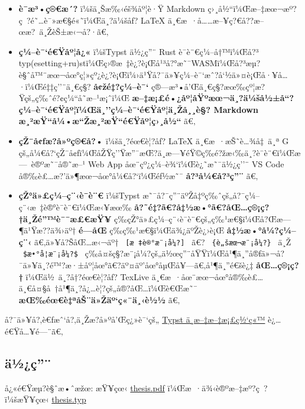 \begin{itemize}
\tightlist
\item
  \textbf{è¯­æ³•ç®€æ´?} ï¼šä¸Šæ‰‹éš¾åº¦è·Ÿ Markdown
  ç›¸å½``ï¼Œæ--‡æœ¬æº?ç~?é˜\ldots è¯»æ€§é«˜ï¼Œä¸?ä¼šåƒ? LaTeX
  ä¸€æ~·å\ldots\ldots æ--¥ç?€å??æ--œæ?~ä¸ŽèŠ±æ‹¬å?·ã€‚
\item
  \textbf{ç¼--è¯`é€Ÿåº¦å¿«} ï¼šTypst ä½¿ç''¨ Rust è¯­è¨€ç¼--å†™ï¼Œå?³
  typ(esetting+ru)stï¼Œç›®æ~‡è¿?è¡Œå¹³å?°æ˜¯WASMï¼Œå?³æµ?è§ˆå™¨æœ¬åœ°ç¦»çº¿è¿?è¡Œï¼›ä¹Ÿå?¯ä»¥ç¼--è¯`æˆ?å`½ä»¤è¡Œå·¥å\ldots·ï¼Œé‡‡ç''¨ä¸€ç§?
  \textbf{å¢žé‡?ç¼--è¯`}
  ç®---æ³•å'Œä¸€ç§?æœ‰çº¦æ?Ÿçš„ç‰ˆé?¢ç¼``å­˜æ--¹æ¡ˆï¼Œ
  \textbf{æ--‡æ¡£é•¿åº¦åŸºæœ¬ä¸?ä¼šå½±å``?ç¼--è¯`é€Ÿåº¦ï¼Œä¸''ç¼--è¯`é€Ÿåº¦ä¸Žå¸¸è§?
  Markdown æ¸²æŸ``å¼•æ``Žæ¸²æŸ``é€Ÿåº¦ç›¸å½``} ã€‚
\item
  \textbf{çŽ¯å¢ƒæ?­å»ºç®€å?•} ï¼šä¸?éœ€è¦?åƒ? LaTeX
  ä¸€æ~·æŠ˜è\ldots¾å‡~ä¸ª G
  çš„å¼€å?{}`çŽ¯å¢ƒï¼ŒåŽŸç''Ÿæ''¯æŒ?ä¸­æ---¥éŸ©ç­‰é?žæ‹‰ä¸?è¯­è¨€ï¼Œæ---~è®ºæ˜¯å®˜æ--¹
  Web App åœ¨çº¿ç¼--è¾`ï¼Œè¿˜æ˜¯ä½¿ç''¨ VS Code
  å®‰è£\ldots æ?'ä»¶æœ¬åœ°å¼€å?{}`ï¼Œéƒ½æ˜¯ \textbf{å?³å¼€å?³ç''¨} ã€‚
\item
  \textbf{çŽ°ä»£ç¼--ç¨‹è¯­è¨€} ï¼šTypst
  æ˜¯å?¯ç''¨äºŽå‡ºç‰ˆçš„å?¯ç¼--ç¨‹æ~‡è®°è¯­è¨€ï¼Œæ‹¥æœ‰
  \textbf{å?˜é‡?ã€?å‡½æ•°ã€?åŒ\ldots ç®¡ç?†ä¸Žé''™è¯¯æ£€æŸ¥}
  ç­‰çŽ°ä»£ç¼--ç¨‹è¯­è¨€çš„ç‰¹æ€§ï¼Œå?Œæ---¶ä¹Ÿæ??ä¾›äº† \textbf{é---­åŒ}
  ç­‰ç‰¹æ€§ï¼Œä¾¿äºŽè¿›è¡Œ \textbf{å‡½æ•°å¼?ç¼--ç¨‹}
  ã€‚ä»¥å?ŠåŒ\ldots æ‹¬äº† \texttt{\ {[}æ~‡è®°æ¨¡å¼?{]}\ } ã€?
  \texttt{\ \{è„šæœ¬æ¨¡å¼?\}\ } ä¸Ž \texttt{\ \$æ•°å­¦æ¨¡å¼?\$\ }
  ç­‰å¤šç§?æ¨¡å¼?çš„ä½œç''¨åŸŸï¼Œå¹¶ä¸''å®ƒä»¬å?¯ä»¥ä¸?é™?æ·±åº¦åœ°ã€?äº¤äº'åœ°åµŒå¥---ã€‚å¹¶ä¸''é€šè¿‡
  \textbf{åŒ\ldots ç®¡ç?†} ï¼Œä½~ä¸?å†?éœ€è¦?åƒ? TexLive
  ä¸€æ~·åœ¨æœ¬åœ°å®‰è£\ldots ä¸€å¤§å~†å¹¶ä¸?å¿\ldots è¦?çš„å®?åŒ\ldots ï¼Œè€Œæ˜¯
  \textbf{æŒ‰éœ€è‡ªåŠ¨ä»Žäº`ç«¯ä¸‹è½½} ã€‚
\end{itemize}

å?¯ä»¥å?‚è€ƒæˆ`å?‚ä¸Žæ?­å»ºå'Œç¿»è¯`çš„
\href{https://typst-doc-cn.github.io/docs/}{Typst ä¸­æ--‡æ--‡æ¡£ç½`ç«™}
è¿\ldots é€Ÿå\ldots¥é---¨ã€‚

\subsection{ä½¿ç''¨}\label{uxe4uxbduxe7}

å¿«é€Ÿæµ?è§ˆæ•ˆæžœ: æŸ¥çœ‹
\href{https://github.com/nju-lug/modern-nju-thesis/releases/latest/download/thesis.pdf}{thesis.pdf}
ï¼Œæ~·ä¾‹è®ºæ--‡æº?ç~?ï¼šæŸ¥çœ‹
\href{https://github.com/nju-lug/modern-nju-thesis/blob/main/template/thesis.typ}{thesis.typ}

